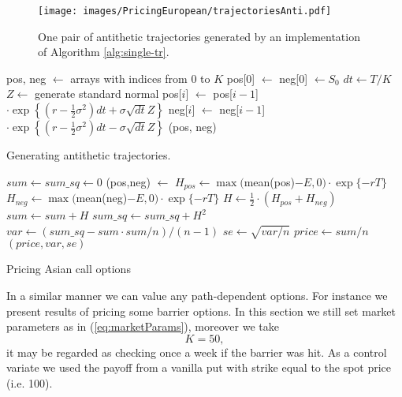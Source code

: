 \documentclass[a4paper,11pt, twoside]{book}
\theoremstyle{definition}
\theoremstyle{remark}
\begin{document}
\begin{figure}[!ht]
\centering
 \texttt{[image: images/PricingEuropean/trajectoriesAnti.pdf]}
\caption{One pair of antithetic trajectories generated by an implementation of Algorithm \ref{alg:single-tr}.}
\label{fig:trajectoriesAnti}
\end{figure}
\begin{algorithm}[!ht]
 \begin{algorithmic}[1]
  \State pos, neg $\gets$ arrays with indices from $0$ to $K$
  \State pos[0] $\gets$ neg[0] $\gets S_0$
  \State $dt \gets T/K$
    \State $Z \gets$ generate standard normal
    \State pos[$i$] $\gets$ pos[$i-1$] $\cdot \exp\left\{ (r - \frac{1}{2}\sigma^2) dt + \sigma \sqrt{dt} Z \right\}$
    \State neg[$i$] $\gets$ neg[$i-1$] $\cdot \exp\left\{ (r - \frac{1}{2}\sigma^2) dt - \sigma \sqrt{dt} Z \right\}$
  \EndFor
  \State \Return (pos, neg)
  \EndFunction
 \end{algorithmic}
 \caption{Generating antithetic trajectories.}
 \label{alg:single-tr}
\end{algorithm}
 
\begin{algorithm}[!ht]
 \begin{algorithmic}[1]
    \State  $sum \gets sum\_sq \gets 0$
      \State (pos,neg) $\gets$ 
      \State $H_{pos} \gets \max($mean(pos)$- E, 0) \cdot \exp\{-rT\}$
      \State $H_{neg} \gets \max($mean(neg)$- E, 0) \cdot \exp\{-rT\}$
      \State $H \gets \frac{1}{2} \cdot (H_{pos} + H_{neg})$
      \State $sum \gets sum + H$
      \State $ sum\_sq \gets sum\_sq + H^2$
    \EndFor
    \State $var \gets (sum\_sq - sum \cdot sum/n) / (n-1)$
    \State $se \gets \sqrt{var / n}$
    \State $price \gets sum / n$
    \State \Return $(price, var, se)$
  \EndFunction
 \end{algorithmic}
 \caption{Pricing Asian call options}
 \label{alg:priceAsianAV}
\end{algorithm}

In a similar manner we can value any path-dependent options. For instance we present results of pricing some barrier options. In this section we still set market parameters as in (\ref{eq:marketParams}), moreover we take
\[ K = 50, \]
it may be regarded as checking once a week if the barrier was hit. As a control variate we used the payoff from a vanilla put with strike equal to the spot price (i.e. 100).
\end{document}
